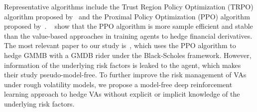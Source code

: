 Representative algorithms include the Trust Region Policy Optimization (TRPO) algorithm proposed by~\cite{schulman2015trust} and the Proximal Policy Optimization (PPO) algorithm proposed by~\cite{schulman2017proximal}.
~\cite{du2020deep} show that the PPO algorithm is more sample efficient and stable than the value-based approaches in training agents to hedge financial derivatives.
The most relevant paper to our study is~\cite{chong2023pseudo}, which uses the PPO algorithm to hedge GMMB with a GMDB rider under the Black-Scholes framework.
However, information of the underlying risk factors is leaked to the agent, which makes their study pseudo-model-free.
To further improve the risk management of VAs under rough volatility models, we propose a model-free deep reinforcement learning approach to hedge VAs without explicit or implicit knowledge of the underlying risk factors.

